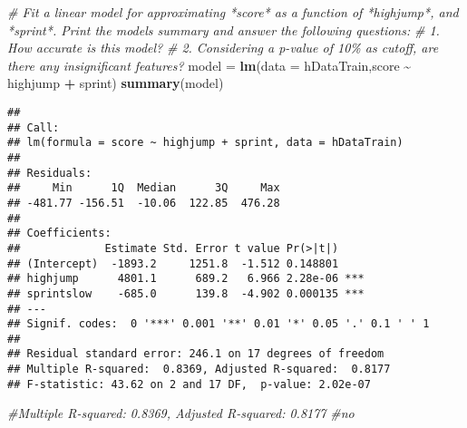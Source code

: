 \documentclass[
]{article}
\newenvironment{Shaded}{\begin{snugshade}}{\end{snugshade}}
\newcommand{\AttributeTok}[1]{\textcolor[rgb]{0.13,0.29,0.53}{#1}}
\newcommand{\CommentTok}[1]{\textcolor[rgb]{0.56,0.35,0.01}{\textit{#1}}}
\newcommand{\FunctionTok}[1]{\textcolor[rgb]{0.13,0.29,0.53}{\textbf{#1}}}
\newcommand{\NormalTok}[1]{#1}
\newcommand{\OtherTok}[1]{\textcolor[rgb]{0.56,0.35,0.01}{#1}}
\newcommand{\SpecialCharTok}[1]{\textcolor[rgb]{0.81,0.36,0.00}{\textbf{#1}}}
\begin{document}
\begin{Shaded}
\begin{Highlighting}[]
\CommentTok{\# Fit a linear model for approximating *score* as a function of *highjump*, and *sprint*. Print the model\textquotesingle{}s summary and answer the following questions:}
\CommentTok{\# 1. How accurate is this model?}
\CommentTok{\# 2. Considering a p{-}value of 10\% as cutoff, are there any insignificant features?}
\NormalTok{model }\OtherTok{=} \FunctionTok{lm}\NormalTok{(}\AttributeTok{data =}\NormalTok{ hDataTrain,score }\SpecialCharTok{\textasciitilde{}}\NormalTok{ highjump }\SpecialCharTok{+}\NormalTok{ sprint)}
\FunctionTok{summary}\NormalTok{(model)}
\end{Highlighting}
\end{Shaded}

\begin{verbatim}
## 
## Call:
## lm(formula = score ~ highjump + sprint, data = hDataTrain)
## 
## Residuals:
##     Min      1Q  Median      3Q     Max 
## -481.77 -156.51  -10.06  122.85  476.28 
## 
## Coefficients:
##             Estimate Std. Error t value Pr(>|t|)    
## (Intercept)  -1893.2     1251.8  -1.512 0.148801    
## highjump      4801.1      689.2   6.966 2.28e-06 ***
## sprintslow    -685.0      139.8  -4.902 0.000135 ***
## ---
## Signif. codes:  0 '***' 0.001 '**' 0.01 '*' 0.05 '.' 0.1 ' ' 1
## 
## Residual standard error: 246.1 on 17 degrees of freedom
## Multiple R-squared:  0.8369, Adjusted R-squared:  0.8177 
## F-statistic: 43.62 on 2 and 17 DF,  p-value: 2.02e-07
\end{verbatim}

\begin{Shaded}
\begin{Highlighting}[]
\CommentTok{\#Multiple R{-}squared:  0.8369,   Adjusted R{-}squared:  0.8177 }
\CommentTok{\#no}
\end{Highlighting}
\end{Shaded}
\end{document}
